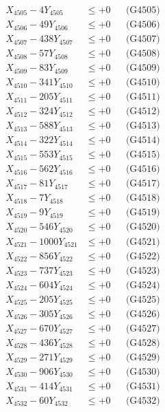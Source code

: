 \documentclass[a4paper,10pt]{article}
\begin{document}
{\begin{align}
X_{4505} - 4Y_{4505} &\leq +0 && \text{(G4505)} \\
X_{4506} - 49Y_{4506} &\leq +0 && \text{(G4506)} \\
X_{4507} - 438Y_{4507} &\leq +0 && \text{(G4507)} \\
X_{4508} - 57Y_{4508} &\leq +0 && \text{(G4508)} \\
X_{4509} - 83Y_{4509} &\leq +0 && \text{(G4509)} \\
X_{4510} - 341Y_{4510} &\leq +0 && \text{(G4510)} \\
\allowbreak
X_{4511} - 205Y_{4511} &\leq +0 && \text{(G4511)} \\
X_{4512} - 324Y_{4512} &\leq +0 && \text{(G4512)} \\
X_{4513} - 588Y_{4513} &\leq +0 && \text{(G4513)} \\
X_{4514} - 322Y_{4514} &\leq +0 && \text{(G4514)} \\
X_{4515} - 553Y_{4515} &\leq +0 && \text{(G4515)} \\
X_{4516} - 562Y_{4516} &\leq +0 && \text{(G4516)} \\
X_{4517} - 81Y_{4517} &\leq +0 && \text{(G4517)} \\
X_{4518} - 7Y_{4518} &\leq +0 && \text{(G4518)} \\
X_{4519} - 9Y_{4519} &\leq +0 && \text{(G4519)} \\
X_{4520} - 546Y_{4520} &\leq +0 && \text{(G4520)} \\
\allowbreak
X_{4521} - 1000Y_{4521} &\leq +0 && \text{(G4521)} \\
X_{4522} - 856Y_{4522} &\leq +0 && \text{(G4522)} \\
X_{4523} - 737Y_{4523} &\leq +0 && \text{(G4523)} \\
X_{4524} - 604Y_{4524} &\leq +0 && \text{(G4524)} \\
X_{4525} - 205Y_{4525} &\leq +0 && \text{(G4525)} \\
X_{4526} - 305Y_{4526} &\leq +0 && \text{(G4526)} \\
X_{4527} - 670Y_{4527} &\leq +0 && \text{(G4527)} \\
X_{4528} - 436Y_{4528} &\leq +0 && \text{(G4528)} \\
X_{4529} - 271Y_{4529} &\leq +0 && \text{(G4529)} \\
X_{4530} - 906Y_{4530} &\leq +0 && \text{(G4530)} \\
\allowbreak
X_{4531} - 414Y_{4531} &\leq +0 && \text{(G4531)} \\
X_{4532} - 60Y_{4532} &\leq +0 && \text{(G4532)} \\

\end{align}}
\end{document}
